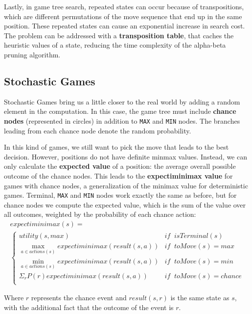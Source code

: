 \documentclass{article}
\newcommand{\code}{\lstinline}
\begin{document}
Lastly, in game tree search, repeated states can occur because of transpositions, which are different permutations of the move sequence that end up in the same position. These repeated states can cause an exponential increase in search cost. The problem can be addressed with a \textbf{transposition table}, that caches the heuristic values of a state, reducing the time complexity of the alpha-beta pruning algorithm. 

\subsection{Stochastic Games}
Stochastic Games bring us a little closer to the real world by adding a random element in the computation. In this case, the game tree must include \textbf{chance nodes} (represented in circles) in addition to \code{MAX} and \code{MIN} nodes. The branches leading from each chance node denote the random probability. 

In this kind of games, we still want to pick the move that leads to the best decision. However, positions do not have definite minmax values. Instead, we can only calculate the \textbf{expected value} of a position: the average overall possible outcome of the chance nodes. This leads to the \textbf{expectiminimax value} for games with chance nodes, a generalization of the minimax value for deterministic games. Terminal, \code{MAX} and \code{MIN} nodes work exactly the same as before, but for chance nodes we compute the expected value, which is the sum of the value over all outcomes, weighted by the probability of each chance action:
\begin{multline*}
    expectiminimax(s) = \\
    \begin{cases}
        utility(s, max) & if \;\; isTerminal(s) \\
        \max_{a\in actions(s)} expectiminimax(result(s, a)) & if \;\; toMove(s) = max \\
        \min_{a \in actions(s)} expectiminimax(result(s, a)) & if \;\; toMove(s) = min \\
        \Sigma_{r}P(r) expectiminimax(result(s, a)) & if\;\; toMove(s) = chance\\
    \end{cases}
\end{multline*}

Where $r$ represents the chance event and $result(s, r)$ is the same state as $s$, with the additional fact that the outcome of the event is $r$.
\end{document}
